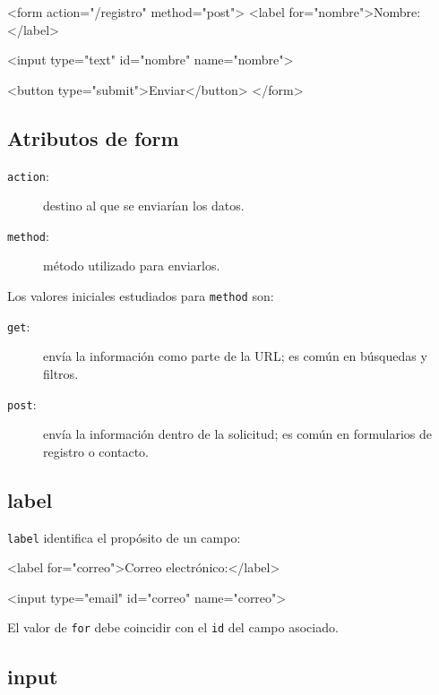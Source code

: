 \documentclass[11pt]{article}
\begin{document}
\begin{htmlcodedark}
    <form action="/registro" method="post">
    <label for="nombre">Nombre:</label>

    <input
    type="text"
    id="nombre"
    name="nombre">

    <button type="submit">Enviar</button>
    </form>
\end{htmlcodedark}

\subsection{Atributos de form}

\begin{description}
    \item[\texttt{action}:] destino al que se enviarían los datos.
    \item[\texttt{method}:] método utilizado para enviarlos.
\end{description}

Los valores iniciales estudiados para \texttt{method} son:

\begin{description}
    \item[\texttt{get}:] envía la información como parte de la URL; es común en búsquedas y filtros.
    \item[\texttt{post}:] envía la información dentro de la solicitud; es común en formularios de registro o contacto.
\end{description}


\subsection{label}

\texttt{label} identifica el propósito de un campo:

\begin{htmlcodedark}
    <label for="correo">Correo electrónico:</label>

    <input
    type="email"
    id="correo"
    name="correo">
\end{htmlcodedark}

El valor de \texttt{for} debe coincidir con el \texttt{id} del campo asociado.

\subsection{input}
\end{document}
